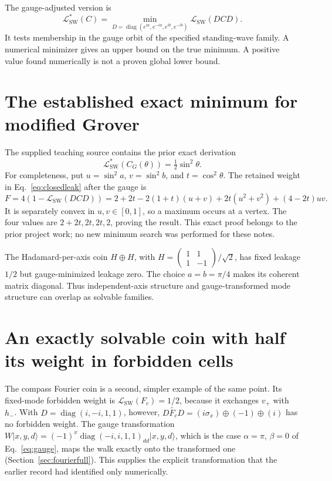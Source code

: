 \documentclass[11pt,a4paper,oneside]{report}
\newcommand{\ket}[1]{\lvert #1\rangle}
\newcommand{\diag}{\operatorname{diag}}
\newcommand{\sw}{\mathrm{SW}}
\numberwithin{equation}{chapter}
\begin{document}
The gauge-adjusted version is
\begin{equation}
\boxed{
\mathcal L^*_{\sw}(C)=
\min_{D=\diag(e^{ia},e^{-ia},e^{ib},e^{-ib})}
\mathcal L_{\sw}(DCD).
}
\end{equation}
It tests membership in the gauge orbit of the specified standing-wave
family. A numerical minimizer gives an upper bound on the true minimum.
A positive value found numerically is not a proven global lower bound.

\section{The established exact minimum for modified Grover}

The supplied teaching source contains the prior exact derivation
\begin{equation}
\boxed{\mathcal L^*_{\sw}(C_G(\theta))=\tfrac12\sin^2\theta.}
\end{equation}
For completeness, put \(u=\sin^2a\), \(v=\sin^2b\), and
\(t=\cos^2\theta\). The retained weight in
Eq.~\eqref{eq:closedleak} after the gauge is
\begin{equation}
F=4(1-\mathcal L_{\sw}(DCD))
=2+2t-2(1+t)(u+v)+2t(u^2+v^2)+(4-2t)uv.
\end{equation}
It is separately convex in \(u,v\in[0,1]\), so a maximum occurs at
a vertex. The four values are \(2+2t,2t,2t,2\), proving the result.
This exact proof belongs to the prior project work; no new minimum
search was performed for these notes.

The Hadamard-per-axis coin \(H\oplus H\), with
\(H=\left(\begin{smallmatrix}1&1\\1&-1\end{smallmatrix}\right)/\sqrt2\),
has fixed leakage \(1/2\) but gauge-minimized leakage zero.
The choice \(a=b=\pi/4\) makes its coherent matrix diagonal.
Thus independent-axis structure and gauge-transformed mode structure
can overlap as solvable families.

\section{An exactly solvable coin with half its weight in forbidden cells}

The compass Fourier coin is a second, simpler example of the same point.
Its fixed-mode forbidden weight is \(\mathcal L_{\sw}(F_c)=1/2\), because
it exchanges \(v_+\) with \(h_-\). With \(D=\diag(i,-i,1,1)\), however,
\(\widetilde{DF_cD}=(i\sigma_x)\oplus(-1)\oplus(i)\) has no forbidden
weight. The gauge transformation
\(W\ket{x,y,d}=(-1)^x\diag(-i,i,1,1)_{dd}\ket{x,y,d}\), which is the case
\(\alpha=\pi\), \(\beta=0\) of Eq.~\eqref{eq:gauge}, maps the walk
exactly onto the transformed one (Section~\ref{sec:fourierfull}). This
supplies the explicit transformation that the earlier record had
identified only numerically.
\end{document}
